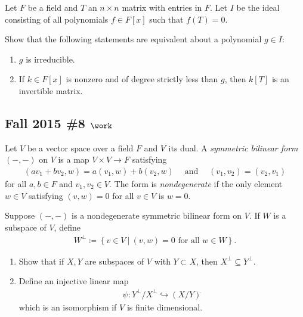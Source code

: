 Let \(F\) be a field and \(T\) an \(n\times n\) matrix with entries in
\(F\). Let \(I\) be the ideal consisting of all polynomials
\(f\in F[x]\) such that \(f(T) =0\).

Show that the following statements are equivalent about a polynomial
\(g\in I\):

\begin{enumerate}
\def\labelenumi{\alph{enumi}.}
\item
  \(g\) is irreducible.
\item
  If \(k\in F[x]\) is nonzero and of degree strictly less than \(g\),
  then \(k[T]\) is an invertible matrix.
\end{enumerate}

\hypertarget{fall-2015-8-work}{%
\subsection{\texorpdfstring{Fall 2015 \#8
\(\work\)}{Fall 2015 \#8 \textbackslash work}}\label{fall-2015-8-work}}

Let \(V\) be a vector space over a field \(F\) and \(V {}^{ \check{} }\)
its dual. A \emph{symmetric bilinear form} \(({-}, {-})\) on \(V\) is a
map \(V\times V\to F\) satisfying
\begin{align*}
(av_1 + b v_2, w) = a(v_1, w) + b(v_2, w) {\quad \operatorname{and} \quad} (v_1, v_2) = (v_2, v_1)
\end{align*}
for all \(a, b\in F\) and \(v_1, v_2 \in V\). The form is
\emph{nondegenerate} if the only element \(w\in V\) satisfying
\((v, w) = 0\) for all \(v\in V\) is \(w=0\).

Suppose \(({-}, {-})\) is a nondegenerate symmetric bilinear form on
\(V\). If \(W\) is a subspace of \(V\), define
\begin{align*}
W^{\perp} \coloneqq\left\{{v\in V {~\mathrel{\Big|}~}(v, w) = 0 \text{ for all } w\in W}\right\}
.\end{align*}

\begin{enumerate}
\def\labelenumi{\alph{enumi}.}
\item
  Show that if \(X, Y\) are subspaces of \(V\) with \(Y\subset X\), then
  \(X^{\perp} \subseteq Y^{\perp}\).
\item
  Define an injective linear map
  \begin{align*}
  \psi: Y^{\perp}/X^{\perp} \hookrightarrow(X/Y) {}^{ \check{} }
  \end{align*}
  which is an isomorphism if \(V\) is finite dimensional.
\end{enumerate}

